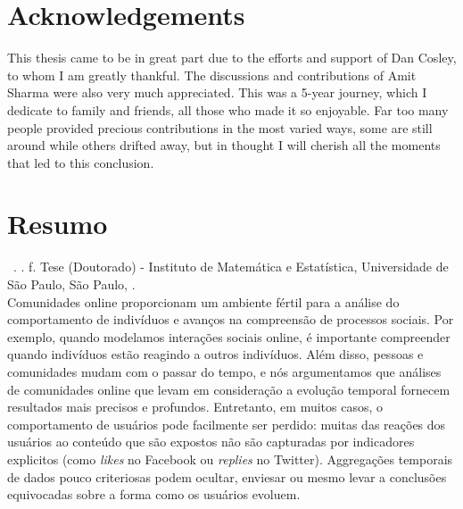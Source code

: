 \documentclass[11pt,twoside,a4paper]{book}
\begin{document}

\chapter*{Acknowledgements}

This thesis came to be in great part due to the efforts and support of Dan Cosley, to whom I am greatly thankful. The discussions and contributions of Amit Sharma were also very much appreciated. This was a 5-year journey, which I dedicate to family and friends, all those who made it so enjoyable. Far too many people provided precious contributions in the most varied ways, some are still around while others drifted away, but in thought I will cherish all the moments that led to this conclusion.


\chapter*{Resumo}

\noindent \surnameAbbr~\textbf{\phdTitleBr}. 
\thesisYear. \thesisPages f. Tese (Doutorado) - Instituto de Matemática e Estatística,
Universidade de São Paulo, São Paulo, \thesisYear.
\\

Comunidades online proporcionam um ambiente fértil para a análise do comportamento de indivíduos e avanços na compreensão de processos sociais. Por exemplo, quando modelamos interações sociais online, é importante compreender quando indivíduos estão reagindo a outros indivíduos. Além disso, pessoas e comunidades mudam com o passar do tempo, e nós argumentamos que análises de comunidades online que levam em consideração a evolução temporal fornecem resultados mais precisos e profundos. Entretanto, em muitos casos, o comportamento de usuários pode facilmente ser perdido: muitas das reações dos usuários ao conteúdo que são expostos não são capturadas por indicadores explicitos (como \textsl{likes} no Facebook ou \textit{replies} no Twitter). Aggregações temporais de dados pouco criteriosas podem ocultar, enviesar ou mesmo levar a conclusões equivocadas sobre a forma como os usuários evoluem. 
\end{document}
